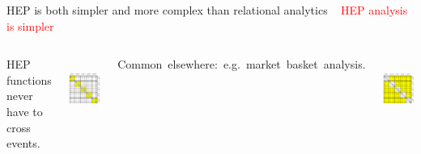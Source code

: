 \documentclass[aspectratio=169]{beamer}
\begin{document}
\begin{frame}{HEP is both simpler and more complex than relational analytics}
\vspace{0.35 cm}
\mbox{ } \hfill \textcolor{red}{\LARGE HEP analysis is simpler} \hfill \mbox{ }

\vspace{0.25 cm}
\begin{columns}

HEP functions never have to cross events.

\vspace{0.25 cm}
\mbox{ } \hfill \includegraphics[width=0.8\linewidth]{event-variable-correlation-hep.pdf} \hfill \mbox{ }


\mbox{\hspace{-0.5 cm}Common elsewhere: e.g.\ market basket analysis.\hspace{-0.5 cm}}

\vspace{0.25 cm}
\mbox{ } \hfill \includegraphics[width=0.8\linewidth]{event-variable-correlation-marketbasket-2.pdf} \hfill \mbox{ }

\end{columns}
\end{frame}
\end{document}

